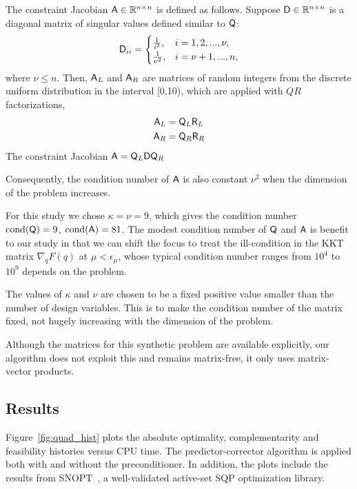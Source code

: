 The constraint Jacobian $\mathsf{A} \in \mathbb{R}^{n\times n}$ is defined as follows. Suppose
$\mathsf{D} \in \mathbb{R}^{n\times n}$ is a diagonal
matrix of singular values defined similar to $\mathsf{Q}$:
\begin{equation*}
  \mathsf{D}_{ii} = \begin{cases}
    \frac{1}{i^2}, &  i = 1,2,...,\nu, \\
    \frac{1}{\nu^2}, & i = \nu+1, ..., n, \\
  \end{cases}
\end{equation*}
where $\nu \leq n$.  Then, $\mathsf{A}_L $ and $\mathsf{A}_R$ are matrices of random integers from 
the discrete uniform distribution in the
interval [0,10),  which are applied with $QR$ factorizations,  
\begin{equation*}
\begin{aligned}
\mathsf{A}_L &= \mathsf{Q}_L \mathsf{R}_L \\
\mathsf{A}_R &= \mathsf{Q}_R \mathsf{R}_R \\
\end{aligned}
\end{equation*}
The constraint Jacobian $\mathsf{A} =\mathsf{Q}_L  \mathsf{D} \mathsf{Q}_R $ 

Consequently, the condition number of $\mathsf{A}$ is also constant $\nu ^2$ when the dimension 
of the problem increases. 


For this study we chose $\kappa = \nu = 9$, which gives the condition number 
$ \text{cond} (\mathsf{Q} )= 9$,  $ \text{cond} (\mathsf{A}) = 81$. The modest condition number of 
$\mathsf{Q} $ and $\mathsf{A}$ is benefit to our study in that we can shift 
the focus to treat the ill-condition in the KKT matrix 
$\nabla_{q} F(q)$ at $\mu<\epsilon_{\mu}$, whose typical condition number ranges from $10^4$ to $10^9$
depends on the problem.

The values of $\kappa$ and $\nu$ are chosen to be a fixed positive
value smaller than the number of design variables.  This is to make the
condition number of the matrix fixed, not hugely increasing with the
dimension of the problem.

\begin{remark}
Although the matrices for this synthetic problem are available explicitly, our
algorithm does not exploit this and remains matrix-free, \ie it only uses
matrix-vector products.
\end{remark}

\subsection{Results}
Figure~\ref{fig:quad_hist} plots the absolute optimality, complementarity and feasibility
histories versus CPU time. 
The predictor-corrector algorithm is applied both with and without the preconditioner.  
In addition, the plots include the results
from SNOPT~\cite{gill:2002}, a well-validated active-set SQP
optimization library.

